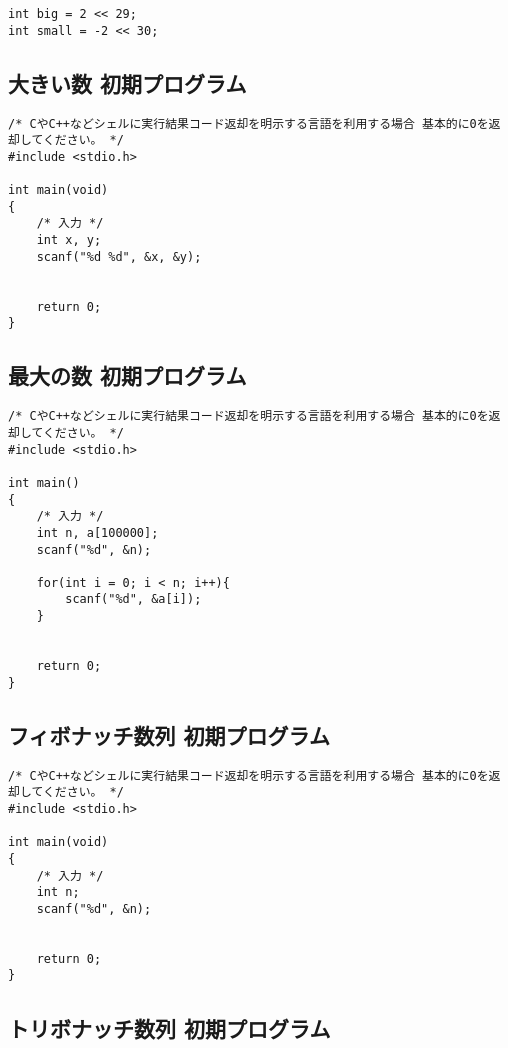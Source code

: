 \noindent
\begin{lstlisting}[style = customC]
int big = 2 << 29;
int small = -2 << 30;
\end{lstlisting}

\clearpage

\subsection{大きい数 初期プログラム}

\begin{lstlisting}[style = customC]
/* CやC++などシェルに実行結果コード返却を明示する言語を利用する場合 基本的に0を返却してください。 */
#include <stdio.h>

int main(void)
{
    /* 入力 */
    int x, y;
    scanf("%d %d", &x, &y);


    return 0;
}
\end{lstlisting}

\subsection{最大の数 初期プログラム}

\begin{lstlisting}[style = customC]
/* CやC++などシェルに実行結果コード返却を明示する言語を利用する場合 基本的に0を返却してください。 */
#include <stdio.h>

int main()
{
    /* 入力 */
    int n, a[100000];
    scanf("%d", &n);

    for(int i = 0; i < n; i++){
        scanf("%d", &a[i]);
    }


    return 0;
}
\end{lstlisting}

\clearpage

\subsection{フィボナッチ数列 初期プログラム}

\begin{lstlisting}[style = customC]
/* CやC++などシェルに実行結果コード返却を明示する言語を利用する場合 基本的に0を返却してください。 */
#include <stdio.h>

int main(void) 
{
    /* 入力 */
    int n;
    scanf("%d", &n);


    return 0; 
}
\end{lstlisting}

\subsection{トリボナッチ数列 初期プログラム}

